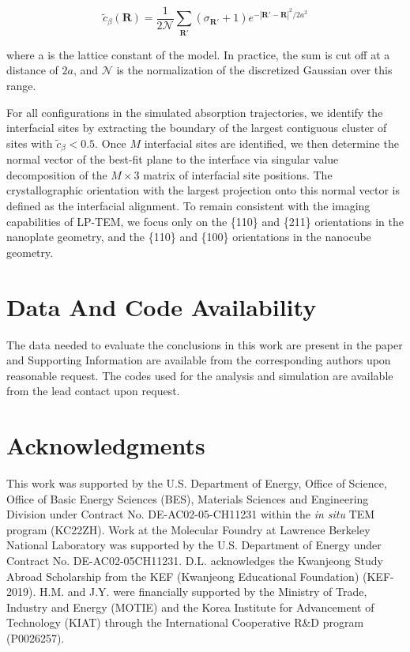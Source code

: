 \documentclass[reprint,amsmath,amssymb,aip,nofootinbib, citeautoscript,]{revtex4-2}
\begin{document}
$$\tilde{c}_\beta(\mathbf{R}) = \frac{1}{2\mathcal{N}}\sum_{\mathbf{R'}}(\sigma_{\mathbf{R'}}+1)e^{-|\mathbf{R'}-\mathbf{R}|^2/2a^2}$$

where a is the lattice constant of the model. In practice, the sum is cut off at a distance of $2a$, and $\mathcal{N}$ is the normalization of the discretized Gaussian over this range.


For all configurations in the simulated absorption trajectories, we identify the interfacial sites by extracting the boundary of the largest contiguous cluster of sites with  $\tilde{c}_\beta< 0.5$. Once $M$ interfacial sites are identified, we then determine the normal vector of the best-fit plane to the interface via singular value decomposition of the $M \times 3$ matrix of interfacial site positions. The crystallographic orientation with the largest projection onto this normal vector is defined as the interfacial alignment. To remain consistent with the imaging capabilities of LP-TEM, we focus only on the \{110\} and \{211\} orientations in the nanoplate geometry, and the \{110\} and \{100\} orientations in the nanocube geometry.


\section*{Data And Code Availability}

The data needed to evaluate the conclusions in this work are present in the paper and Supporting Information are available from the corresponding authors upon reasonable request. The codes used for the analysis and simulation are available from the lead contact upon request.


\section*{Acknowledgments}

This work was supported by the U.S. Department of Energy, Office of Science, Office of Basic Energy Sciences (BES), Materials Sciences and Engineering Division under Contract No. DE-AC02-05-CH11231 within the \textit{in situ} TEM program (KC22ZH). Work at the Molecular Foundry at Lawrence Berkeley National Laboratory was supported by the U.S. Department of Energy under Contract No. DE-AC02-05CH11231. D.L. acknowledges the Kwanjeong Study Abroad Scholarship from the KEF (Kwanjeong Educational Foundation) (KEF-2019). H.M. and J.Y. were financially supported by the Ministry of Trade, Industry and Energy (MOTIE) and the Korea Institute for Advancement of Technology (KIAT) through the International Cooperative R\&D program (P0026257).
\end{document}
